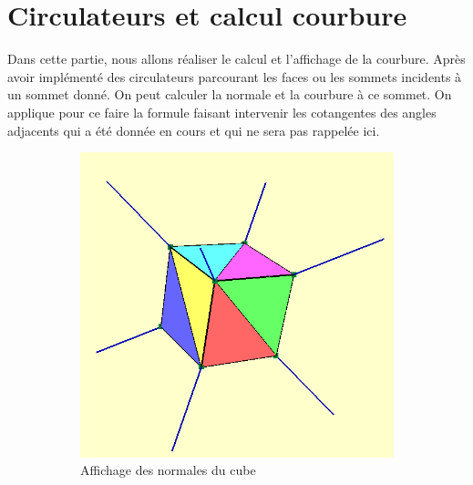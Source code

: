\documentclass[12pt,a4paper,twoside]{report}
\begin{document}
\newpage\section{Circulateurs et calcul courbure}

Dans cette partie, nous allons réaliser le calcul et l'affichage de la courbure. Après avoir implémenté des circulateurs parcourant les faces ou les sommets incidents à un sommet donné. On peut calculer la normale et la courbure à ce sommet. On applique pour ce faire la formule faisant intervenir les cotangentes des angles adjacents qui a été donnée en cours et qui ne sera pas rappelée ici.

\begin{figure}[H]
	\centering
	\begin{subfigure}{.4\textwidth}
		\centering
		\includegraphics[width=\textwidth]{normales_cube.png}
		\caption{Affichage des normales du cube}			
		\label{fig:normales_cube}
	\end{subfigure}
	\begin{subfigure}{.4\textwidth}
		\centering

\end{subfigure}
\end{figure}
\end{document}
